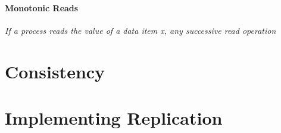 \documentclass[11pt]{article}
\begin{document}

\paragraph{Monotonic Reads} %
\label{par:monotonic_reads}
\textit{If a process reads the value of a data item x, any successive read operation }


\section{Consistency} %
\label{sec:consistency}


\section{Implementing Replication} %
\label{sec:implementing_replication}

\end{document}
